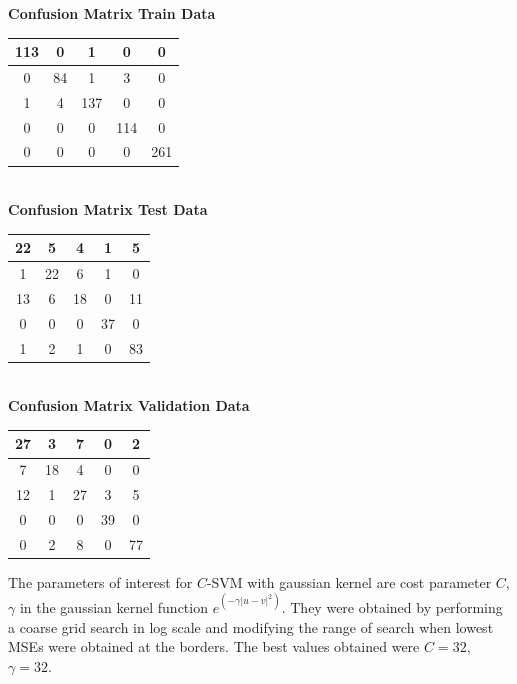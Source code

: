 \documentclass{article}
\begin{document}
\begin{flushleft}
\textbf{Confusion Matrix Train Data\\[5pt]}
\begin{tabular}{|c|c|c|c|c|}
\hline
113 & 0 & 1 & 0 & 0 \\
\hline
0 & 84 & 1 & 3 & 0 \\
\hline
1 & 4 & 137 & 0 & 0\\
\hline
0 & 0 & 0 & 114 & 0\\
\hline
0 & 0 & 0 & 0 & 261 \\
\hline
\end{tabular}
\textbf{\\[10pt] Confusion Matrix Test Data \\[5pt]}
\begin{tabular}{|c|c|c|c|c|}
\hline
22 & 5 & 4 & 1 & 5\\
\hline
1 & 22 & 6 & 1 & 0 \\
\hline
13 & 6 & 18 & 0 & 11 \\
\hline
0 & 0 & 0 & 37 & 0 \\
\hline
1 & 2 & 1 & 0 & 83 \\
\hline
\end{tabular}
\textbf{\\[10pt] Confusion Matrix Validation Data \\[5pt]}
\begin{tabular}{|c|c|c|c|c|}
\hline
27 & 3 & 7 & 0 & 2 \\
\hline
7 & 18 & 4 & 0 & 0 \\
\hline
12 & 1 & 27 & 3 & 5 \\
\hline
0 & 0 & 0 & 39 & 0 \\
\hline
0 & 2 & 8 & 0 & 77 \\
\hline
\end{tabular}
\end{flushleft}

The parameters of interest for $C$-SVM with gaussian kernel are cost parameter $C$, $\gamma$ in the gaussian kernel function $e^{(-\gamma|u-v|^{2})}$. They were obtained by performing a coarse grid search in log scale and modifying the range of search when lowest MSEs were obtained at the borders.
The best values obtained were $C=32$, $\gamma=32$.
\end{document}
